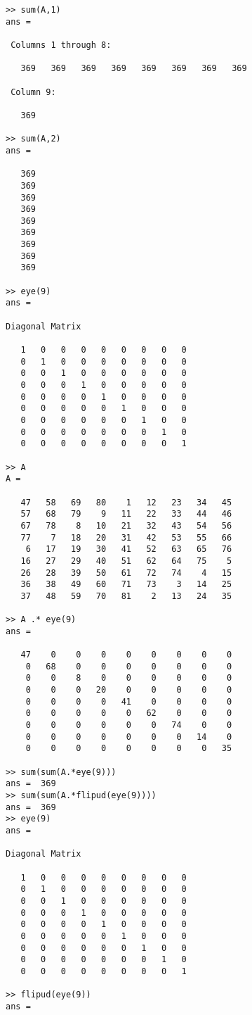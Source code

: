 \documentclass{article}
\begin{document}
\begin{CJK}{UTF8}{gbsn}
\begin{verbatim}
>> sum(A,1)
ans =

 Columns 1 through 8:

   369   369   369   369   369   369   369   369

 Column 9:

   369

>> sum(A,2)
ans =

   369
   369
   369
   369
   369
   369
   369
   369
   369

>> eye(9)
ans =

Diagonal Matrix

   1   0   0   0   0   0   0   0   0
   0   1   0   0   0   0   0   0   0
   0   0   1   0   0   0   0   0   0
   0   0   0   1   0   0   0   0   0
   0   0   0   0   1   0   0   0   0
   0   0   0   0   0   1   0   0   0
   0   0   0   0   0   0   1   0   0
   0   0   0   0   0   0   0   1   0
   0   0   0   0   0   0   0   0   1

>> A
A =

   47   58   69   80    1   12   23   34   45
   57   68   79    9   11   22   33   44   46
   67   78    8   10   21   32   43   54   56
   77    7   18   20   31   42   53   55   66
    6   17   19   30   41   52   63   65   76
   16   27   29   40   51   62   64   75    5
   26   28   39   50   61   72   74    4   15
   36   38   49   60   71   73    3   14   25
   37   48   59   70   81    2   13   24   35

>> A .* eye(9)
ans =

   47    0    0    0    0    0    0    0    0
    0   68    0    0    0    0    0    0    0
    0    0    8    0    0    0    0    0    0
    0    0    0   20    0    0    0    0    0
    0    0    0    0   41    0    0    0    0
    0    0    0    0    0   62    0    0    0
    0    0    0    0    0    0   74    0    0
    0    0    0    0    0    0    0   14    0
    0    0    0    0    0    0    0    0   35

>> sum(sum(A.*eye(9)))
ans =  369
>> sum(sum(A.*flipud(eye(9))))
ans =  369
>> eye(9)
ans =

Diagonal Matrix

   1   0   0   0   0   0   0   0   0
   0   1   0   0   0   0   0   0   0
   0   0   1   0   0   0   0   0   0
   0   0   0   1   0   0   0   0   0
   0   0   0   0   1   0   0   0   0
   0   0   0   0   0   1   0   0   0
   0   0   0   0   0   0   1   0   0
   0   0   0   0   0   0   0   1   0
   0   0   0   0   0   0   0   0   1

>> flipud(eye(9))
ans =


\end{verbatim}
\end{CJK}
\end{document}
